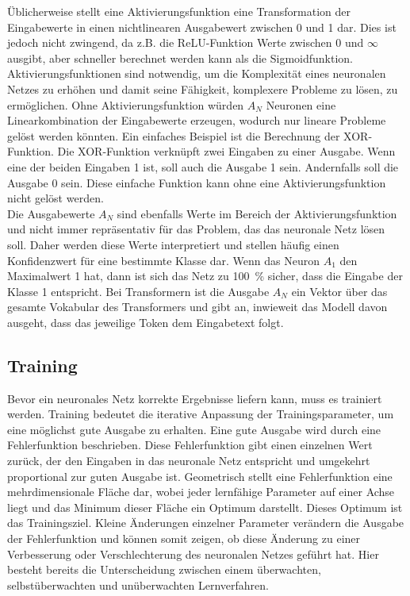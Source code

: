Üblicherweise stellt eine Aktivierungsfunktion eine Transformation der Eingabewerte in einen nichtlinearen Ausgabewert zwischen 0 und 1 dar.
Dies ist jedoch nicht zwingend, da z.B. die ReLU-Funktion Werte zwischen 0 und $\infty$ ausgibt, aber schneller berechnet werden kann als die Sigmoidfunktion.
Aktivierungsfunktionen sind notwendig, um die Komplexität eines neuronalen Netzes zu erhöhen und damit seine Fähigkeit, komplexere Probleme zu lösen, zu ermöglichen.
Ohne Aktivierungsfunktion würden $A_N$ Neuronen eine Linearkombination der Eingabewerte erzeugen, wodurch nur lineare Probleme gelöst werden könnten.
Ein einfaches Beispiel ist die Berechnung der XOR-Funktion.
Die XOR-Funktion verknüpft zwei Eingaben zu einer Ausgabe. Wenn eine der beiden Eingaben 1 ist, soll auch die Ausgabe 1 sein.
Andernfalls soll die Ausgabe 0 sein.
Diese einfache Funktion kann ohne eine Aktivierungsfunktion nicht gelöst werden.\\

Die Ausgabewerte $A_N$ sind ebenfalls Werte im Bereich der Aktivierungsfunktion und nicht immer repräsentativ für das Problem, das das neuronale Netz lösen soll.
Daher werden diese Werte interpretiert und stellen häufig einen Konfidenzwert für eine bestimmte Klasse dar.
Wenn das Neuron $A_1$ den Maximalwert 1 hat, dann ist sich das Netz zu \SI{100}{\percent} sicher, dass die Eingabe der Klasse 1 entspricht.
Bei Transformern ist die Ausgabe $A_N$ ein Vektor über das gesamte Vokabular des Transformers und gibt an, inwieweit das Modell davon ausgeht, dass das jeweilige Token dem Eingabetext folgt.\\

\subsection{Training}\label{subsec:grundlagen:training}
Bevor ein neuronales Netz korrekte Ergebnisse liefern kann, muss es trainiert werden.
Training bedeutet die iterative Anpassung der Trainingsparameter, um eine möglichst gute Ausgabe zu erhalten.
Eine gute Ausgabe wird durch eine Fehlerfunktion beschrieben.
Diese Fehlerfunktion gibt einen einzelnen Wert zurück, der den Eingaben in das neuronale Netz entspricht und umgekehrt proportional zur guten Ausgabe ist.
Geometrisch stellt eine Fehlerfunktion eine mehrdimensionale Fläche dar, wobei jeder lernfähige Parameter auf einer Achse liegt und das Minimum dieser Fläche ein Optimum darstellt.
Dieses Optimum ist das Trainingsziel.
Kleine Änderungen einzelner Parameter verändern die Ausgabe der Fehlerfunktion und können somit zeigen, ob diese Änderung zu einer Verbesserung oder Verschlechterung des neuronalen Netzes geführt hat.
Hier besteht bereits die Unterscheidung zwischen einem überwachten, selbstüberwachten und unüberwachten Lernverfahren.\\

